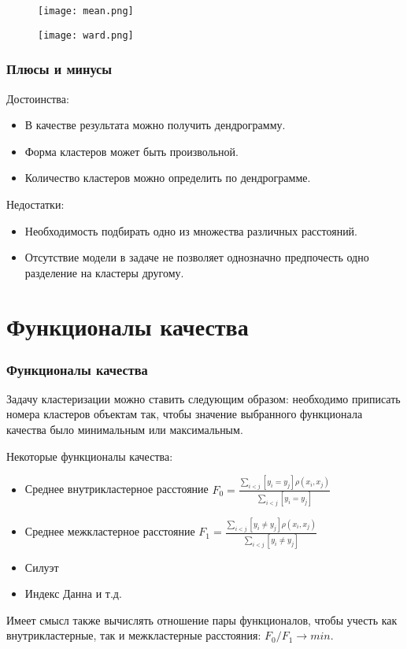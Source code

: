 \documentclass[12pt,pdf,notheorems]{beamer}
\begin{document}
\begin{frame}
\begin{figure}
	\centering
	\texttt{[image: mean.png]}
\end{figure}
\end{frame}

\begin{frame}
\begin{figure}
	\centering
	\texttt{[image: ward.png]}
\end{figure}
\end{frame}

\begin{frame}\frametitle{Плюсы и минусы}
Достоинства:
	\begin{itemize}
	\item В качестве результата можно получить дендрограмму.
	\item Форма кластеров может быть произвольной.
	\item Количество кластеров можно определить по дендрограмме.
	\end{itemize}
Недостатки:
	\begin{itemize}
	\item Необходимость подбирать одно из множества различных расстояний.
	\item Отсутствие модели в задаче не позволяет однозначно предпочесть одно разделение на кластеры другому.
	\end{itemize}

\end{frame}

\section[Функционалы качества]{Функционалы качества}

\begin{frame}[shrink=15]\frametitle{Функционалы качества}
Задачу кластеризации можно ставить следующим образом: необходимо приписать номера кластеров
 объектам так, чтобы значение выбранного функционала качества было минимальным или максимальным.
\medskip

Некоторые функционалы качества:
	\begin{itemize}
	\item Среднее внутрикластерное расстояние $F_0=\frac{\sum_{i<j} [y_i=y_j] \rho(x_i, x_j)}{\sum_{i<j} [y_i=y_j]}$
		\medskip

	\item Среднее межкластерное расстояние $F_1=\frac{\sum_{i<j} [y_i \neq y_j] \rho(x_i, x_j)}{\sum_{i<j} [y_i \neq y_j]}$
	\item Силуэт
	\item Индекс Данна и т.д.
	\end{itemize}

	Имеет смысл также вычислять отношение пары функционалов, чтобы учесть как внутрикластерные, так и межкластерные расстояния: $F_0/F_1 \rightarrow min$.
\end{frame}
\end{document}
